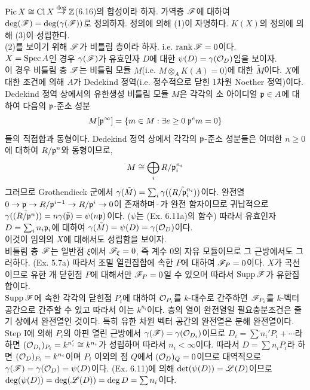 \begin{enumerate}[label=\tb{6.\arabic*.},itemindent=0mm,itemsep=4mm]
	$\operatorname{Pic} X\cong\operatorname{Cl} X\stackrel{\mathrm{deg}}{\rightarrow}\mathbb Z$(6.16)의 합성이라 하자.
	가역층 $\mathscr{F}$에 대하여 $\deg(\mathscr{F})=\deg(\gamma(\mathscr{F}))$로 정의하자.
	정의에 의해 (1)이 자명하다. $K(X)$의 정의에 의해 (3)이 성립한다.\\
	(2)를 보이기 위해 $\mathscr{F}$가 비틀림 층이라 하자. i.e. $\operatorname{rank}\mathscr{F}=0$이다.\\
	 $X=\operatorname{Spec} A$인 경우 $\gamma(\mathscr{F})$가 유효인자 $D$에 대한 $\psi(D)=\gamma(\mathcal{O}_D)$임을 보이자.\\
	이 경우 비틀림 층 $\mathscr{F}$는 비틀림 모듈 $M$(i.e. $M\otimes_AK(A)=0$)에 대한 $\tilde M$이다.
	$X$에 대한 조건에 의해 $A$가 Dedekind 정역(i.e. 정수적으로 닫힌 1차원 Noether 정역)이다.
	Dedekind 정역 상에서의 유한생성 비틀림 모듈 $M$은 각각의 소 아이디얼 $\mathfrak{p}\in A$에 대하여
	다음의 $\mathfrak{p}$-준소 성분
	$$M[\mathfrak{p}^\infty]=\{m\in M:\exists e\ge 0\;\mathfrak{p}^em=0\}$$
	들의 직접합과 동형이다. Dedekind 정역 상에서 각각의 $\mathfrak{p}$-준소 성분들은 어떠한 $n\ge 0$에 대하여 $R/\mathfrak{p}^n$와 동형이므로,
	$$M\cong\bigoplus_iR/\mathfrak{p}_i^{n_i}$$
	그러므로 Grothendieck 군에서 $\gamma(\tilde M)=\sum_i\gamma(\tilde{(R/\mathfrak{p}_i^{n_i})})$이다.
	완전열 $0\rightarrow\mathfrak{p}\rightarrow R/\mathfrak{p}^{i-1}\rightarrow R/\mathfrak{p}^i\rightarrow 0$이 존재하며 $\tilde{\;}$가 완전 함자이므로
	귀납적으로 $\gamma(\tilde{(R/\mathfrak{p}^n)})=n\gamma(\tilde{\mathfrak{p}})=\psi(n\mathfrak{p})$이다. ($\psi$는 (Ex. 6.11a)의 함수)
	따라서 유효인자 $D=\sum_in_i\mathfrak{p}_i$에 대하여 $\gamma(\tilde M)=\psi(D)=\gamma(\mathcal{O}_D)$이다.\\
	 이것이 임의의 $X$에 대해서도 성립함을 보이자.\\
	비틀림 층 $\mathscr{F}$는 일반점 $\xi$에서 $\mathscr{F}_\xi=0$, 즉 계수 0의 자유 모듈이므로 그 근방에서도 그러하다. (Ex. 5.7a)
	따라서 조밀 열린집합에 속한 $P$에 대하여 $\mathscr{F}_P=0$이다.
	$X$가 곡선이므로 유한 개 닫힌점 $P$에 대해서만 $\mathscr{F}_P=0$일 수 있으며 따라서 $\operatorname{Supp}\mathscr{F}$가 유한집합이다.\\
	$\operatorname{Supp}\mathscr{F}$에 속한 각각의 닫힌점 $P_i$에 대하여 $\mathcal{O}_{P_i}$를 $k$-대수로 간주하면
	$\mathscr{F}_{P_i}$를 $k$-벡터 공간으로 간주할 수 있고 따라서 이는 $k^{n_i}$이다.
	층의 열이 완전열일 필요충분조건은 줄기 상에서 완전열인 것이다. 특히 유한 차원 벡터 공간의 완전열은 분해 완전열이다.
	Step I에 의해 $P_i$의 아핀 열린 근방에서 $\gamma(\mathscr{F})=\gamma(\mathcal{O}_{D_i})$이므로 $D_i=\sum n_i'P_i+\cdots$라 하면
	$(\mathcal{O}_{D_i})_{P_i}=k^{n_i'}\cong k^{n_i}$가 성립하며 따라서 $n_i<\infty$이다.
	따라서 $D=\sum n_iP_i$라 하면 $(\mathcal{O}_D)_{P_i}=k^{n_i}$이며 $P_i$ 이외의 점 $Q$에서 $(\mathcal{O}_D)_Q=0$이므로
	대역적으로 $\gamma(\mathscr{F})=\gamma(\mathcal{O}_D)=\psi(D)$이다.
	(Ex. 6.11)에 의해 $\det(\psi(D))=\mathscr{L}(D)$이므로 $\deg(\psi(D))=\deg(\mathscr{L}(D))=\deg D=\sum n_i$이다.

\end{enumerate}
